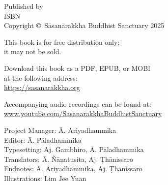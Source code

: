 
\cleartoverso
\thispagestyle{empty}

{%

	\ifafiveversion \fontsize{10}{16}\selectfont \fi
	\ifninebythirteenversion \fontsize{7.5}{11}\selectfont \fi
	\centering
	\setlength{\parindent}{0pt}%

	\ifafiveversion \vspace{0.5cm} \fi
	\ifninebythirteenversion \vspace{0.15cm} \fi

	Published by \publisher\\

	ISBN \theISBN\\
	Copyright \copyright\ Sāsanārakkha Buddhist Sanctuary 2025

	\ifafiveversion \vspace{0.5cm} \fi
	\ifninebythirteenversion \vspace{0.25cm} \fi

	This book is for free distribution only;\\
	it may not be sold.

	\ifafiveversion \vspace{0.5cm} \fi
	\ifninebythirteenversion \vspace{0.25cm} \fi

	Download this book as a PDF, EPUB, or MOBI\\
	at the following address:\\
	\href{https://sasanarakkha.org/}{https://sasanarakkha.org}

	Accompanying audio recordings can be found at: 
	\href{www.youtube.com/SasanarakkhaBuddhistSanctuary}{www.youtube.com/SasanarakkhaBuddhistSanctuary}

	\ifafiveversion \vspace{0.5cm} \fi
	\ifninebythirteenversion \vspace{0.25cm} \fi

	Project Manager: Ā. Ariyadhammika\\
	Editor: Ā. Pāladhammika\\
	Typesetting: Aj. Gambhiro, Ā. Pāladhammika\\
	Translators: Ā. Ñāṇatusita, Aj. Ṭhānissaro\\
	Endnotes: Ā. Ariyadhammika, Aj. Ṭhānissaro\\
	Illustrations: Lim Jee Yuan

	\ifafiveversion \vspace{0.5cm} \fi
	\ifninebythirteenversion \vspace{0.25cm} \fi

}
